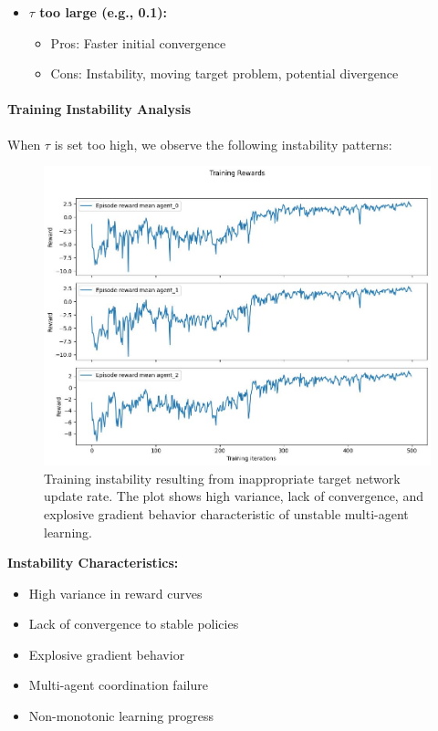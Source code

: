 \documentclass[conference]{IEEEtran}
\begin{document}
{{\begin{itemize}
    \item \textbf{$\tau$ too large (e.g., 0.1):}
    \begin{itemize}
        \item Pros: Faster initial convergence
        \item Cons: Instability, moving target problem, potential divergence
    \end{itemize}
\end{itemize}

\paragraph{Training Instability Analysis}

When $\tau$ is set too high, we observe the following instability patterns:

\begin{figure}[h!]
    \centering
    \includegraphics[width=0.75\linewidth]{figs/results.jpg}
    \caption{Training instability resulting from inappropriate target network update rate. The plot shows high variance, lack of convergence, and explosive gradient behavior characteristic of unstable multi-agent learning.}
    \label{fig:unstable_learning}
\end{figure}

\textbf{Instability Characteristics:}
\begin{itemize}
    \item High variance in reward curves
    \item Lack of convergence to stable policies
    \item Explosive gradient behavior
    \item Multi-agent coordination failure
    \item Non-monotonic learning progress
\end{itemize}

}}
\end{document}
